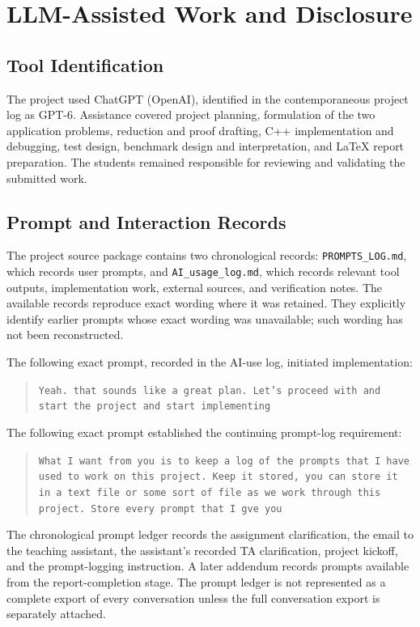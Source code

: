 \appendices
\section{LLM-Assisted Work and Disclosure}

\subsection{Tool Identification}
The project used ChatGPT (OpenAI), identified in the contemporaneous project log as GPT-6. Assistance covered project planning, formulation of the two application problems, reduction and proof drafting, C++ implementation and debugging, test design, benchmark design and interpretation, and LaTeX report preparation. The students remained responsible for reviewing and validating the submitted work.

\subsection{Prompt and Interaction Records}
The project source package contains two chronological records: \texttt{PROMPTS\_LOG.md}, which records user prompts, and \texttt{AI\_usage\_log.md}, which records relevant tool outputs, implementation work, external sources, and verification notes. The available records reproduce exact wording where it was retained. They explicitly identify earlier prompts whose exact wording was unavailable; such wording has not been reconstructed.

The following exact prompt, recorded in the AI-use log, initiated implementation:
\begin{quote}
\texttt{Yeah. that sounds like a great plan. Let's proceed with and start the project and start implementing}
\end{quote}

The following exact prompt established the continuing prompt-log requirement:
\begin{quote}
\texttt{What I want from you is to keep a log of the prompts that I have used to work on this project. Keep it stored, you can store it in a text file or some sort of file as we work through this project. Store every prompt that I gve you}
\end{quote}

The chronological prompt ledger records the assignment clarification, the email to the teaching assistant, the assistant's recorded TA clarification, project kickoff, and the prompt-logging instruction. A later addendum records prompts available from the report-completion stage. The prompt ledger is not represented as a complete export of every conversation unless the full conversation export is separately attached.

